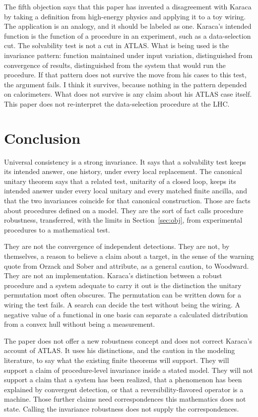 \documentclass[12pt]{article}
\begin{document}
The fifth objection says that this paper has invented a disagreement with Karaca by taking a definition from high-energy physics and applying it to a toy wiring. The application is an analogy, and it should be labeled as one. Karaca's intended function is the function of a procedure in an experiment, such as a data-selection cut. The solvability test is not a cut in ATLAS. What is being used is the invariance pattern: function maintained under input variation, distinguished from convergence of results, distinguished from the system that would run the procedure. If that pattern does not survive the move from his cases to this test, the argument fails. I think it survives, because nothing in the pattern depended on calorimeters. What does not survive is any claim about his ATLAS case itself. This paper does not re-interpret the data-selection procedure at the LHC.

\section{Conclusion}
\label{sec:end}

Universal consistency is a strong invariance. It says that a solvability test keeps its intended answer, one history, under every local replacement. The canonical unitary theorem says that a related test, unitarity of a closed loop, keeps its intended answer under every local unitary and every matched finite ancilla, and that the two invariances coincide for that canonical construction. Those are facts about procedures defined on a model. They are the sort of fact \citet{karaca2022} calls procedure robustness, transferred, with the limits in Section~\ref{sec:obj}, from experimental procedures to a mathematical test.

They are not the convergence of independent detections. They are not, by themselves, a reason to believe a claim about a target, in the sense of the warning \citet{kuorikoski2007} quote from Orzack and Sober and attribute, as a general caution, to Woodward. They are not an implementation. Karaca's distinction between a robust procedure and a system adequate to carry it out is the distinction the unitary permutation most often obscures. The permutation can be written down for a wiring the test fails. A search can decide the test without being the wiring. A negative value of a functional in one basis can separate a calculated distribution from a convex hull without being a measurement.

The paper does not offer a new robustness concept and does not correct Karaca's account of ATLAS. It uses his distinctions, and the caution in the modeling literature, to say what the existing finite theorems will support. They will support a claim of procedure-level invariance inside a stated model. They will not support a claim that a system has been realized, that a phenomenon has been explained by convergent detection, or that a reversibility-flavored operator is a machine. Those further claims need correspondences this mathematics does not state. Calling the invariance robustness does not supply the correspondences.
\end{document}
